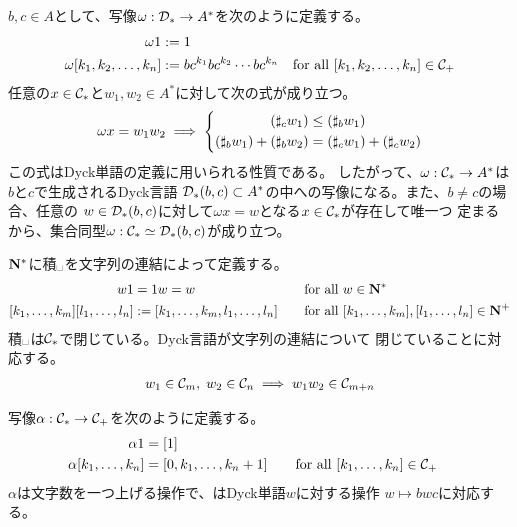 {	$b,c\in A$として、写像$\omega:{{\mathcal{D}}}_*\to A^*$を次のように定義する。
	\begin{equation*}\begin{split}
		\omega1 &:= 1 \\
		\omega[k_1,k_2,\dots,k_n] &:= bc^{k_1}bc^{k_2}\cdots bc^{k_n}
		 \quad\text{for all } [k_1,k_2,\dots,k_n]\in{\ensuremath{{\mathcal{C}}}}_+
	\end{split}\end{equation*}
	任意の$x\in{\ensuremath{{\mathcal{C}}}}_*$と$w_1,w_2\in A^*$に対して次の式が成り立つ。
	\begin{equation*}\begin{split}
		\omega x = w_1w_2 \implies 
		\left\{\begin{split}
			\left({\sharp_cw_1}\right) &\le \left({\sharp_bw_1}\right) \\
			\left({\sharp_bw_1}\right) + \left({\sharp_bw_2}\right) 
			&= \left({\sharp_cw_1}\right) + \left({\sharp_cw_2}\right)
		\end{split}\right. \\
	\end{split}\end{equation*}
	この式はDyck単語の定義に用いられる性質である。
	したがって、$\omega:{{\mathcal{C}}}_*\to A^*$は$b$と$c$で生成されるDyck言語
	${{\mathcal{D}}}_*(b,c)\subset A^*$の中への写像になる。また、$b\neq c$の場合、任意の
	$w\in{\ensuremath{{\mathcal{D}}}}_*(b,c)$に対して$\omega x=w$となる$x\in{\ensuremath{{\mathcal{C}}}}_*$が存在して唯一つ
	定まるから、集合同型$\omega:{{\mathcal{C}}}_*\simeq{\ensuremath{{\mathcal{D}}}}_*(b,c)$が成り立つ。

	$\mathbf{N}^*$に積$\myspace$を文字列の連結によって定義する。
	\begin{alignat*}{2}
		w1 &= 1w = w &\quad&\text{for all } w\in\mathbf{N}^* \\
		[k_1,\dots,k_m][l_1,\dots,l_n] &:= [k_1,\dots,k_m,l_1,\dots,l_n]
		&\quad&\text{for all } [k_1,\dots,k_m],[l_1,\dots,l_n]\in\mathbf{N}^+
	\end{alignat*}
	積$\myspace$は${{\mathcal{C}}}_*$で閉じている。Dyck言語が文字列の連結について
	閉じていることに対応する。
	\begin{equation*}\begin{split}
		w_1\in{\ensuremath{{\mathcal{C}}}}_m,\; w_2\in{\ensuremath{{\mathcal{C}}}}_n\implies w_1w_2\in{\ensuremath{{\mathcal{C}}}}_{m+n}
	\end{split}\end{equation*}

	写像$\alpha:{{\mathcal{C}}}_*\to{\ensuremath{{\mathcal{C}}}}_+$を次のように定義する。
	\begin{alignat*}{2}
		\alpha1 &= [1] \\
		\alpha[k_1,\dots,k_n] &= [0,k_1,\dots,k_n+1]
		&\quad& \text{for all } [k_1,\dots,k_n]\in{\ensuremath{{\mathcal{C}}}}_+
	\end{alignat*}
	$\alpha$は文字数を一つ上げる操作で、はDyck単語$w$に対する操作
	$w\mapsto bwc$に対応する。

}
